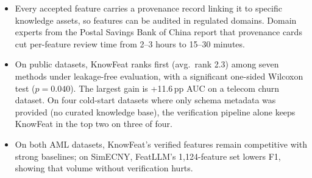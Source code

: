 \begin{itemize}
    \item Every accepted feature carries a provenance record linking it to specific knowledge assets, so features can be audited in regulated domains. Domain experts from the Postal Savings Bank of China report that provenance cards cut per-feature review time from 2--3 hours to 15--30 minutes.
    \item On public datasets, KnowFeat ranks first (avg.\ rank 2.3) among seven methods under leakage-free evaluation, with a significant one-sided Wilcoxon test ($p{=}0.040$). The largest gain is +11.6\,pp AUC on a telecom churn dataset. On four cold-start datasets where only schema metadata was provided (no curated knowledge base), the verification pipeline alone keeps KnowFeat in the top two on three of four.
    \item On both AML datasets, KnowFeat's verified features remain competitive with strong baselines; on SimECNY, FeatLLM's 1{,}124-feature set lowers F1, showing that volume without verification hurts.
\end{itemize}
